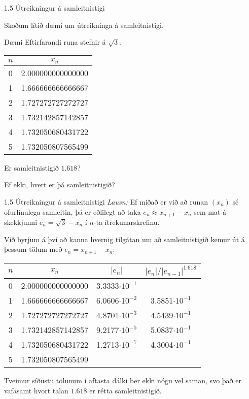 %
\begin{frame}{1.5 Útreikningur á samleitnistigi} 

Skoðum lítið dæmi um útreikninga á samleitnistigi. 

\begin{block}{Dæmi}
Eftirfarandi runa stefnir á  $\sqrt 3$. 
\begin{center}
	\begin{tabular}{c|c|}
		$n$ & $x_n$ \\ \hline
		0&  2.000000000000000 \\
		1&  1.666666666666667 \\
		2&  1.727272727272727 \\
		3&  1.732142857142857 \\
		4&  1.732050680431722 \\
		5&  1.732050807565499 \\
	\end{tabular}
\end{center}
\pause

Er samleitnistigið $1.618$?

Ef ekki, hvert er þá samleitnistigið?
\end{block}
\end{frame}
%

%
\begin{frame}{1.5 Útreikningur á samleitnistigi} 
{\it Lausn:} Ef miðað er við að  runan $(x_n)$ sé  ofurlínulega
samleitin, þá er eðlilegt að taka $e_n\approx x_{n+1}-x_n$ sem mat á
skekkjunni $e_n=\sqrt 3-x_n$ í $n$-ta  
ítrekunarskrefinu. 

\pause

\smallskip
Við byrjum á því að kanna hvernig tilgátan
um að samleitnistigið kemur út á þessum tölum með $e_n=x_{n+1}-x_n$:
\begin{center}
\begin{tabular}{c|c|c|c|}
$n$ & $x_n$ & $|e_n|$ & $|e_n|/|e_{n-1}|^{1.618}$  \\ \hline
0&  2.000000000000000 & 3.3333$\cdot 10^{-1}$ & \\
1&  1.666666666666667 & 6.0606$\cdot 10^{-2}$ & 3.5851$\cdot 10^{-1}$\\
2&  1.727272727272727 & 4.8701$\cdot 10^{-3}$ & 4.5439$\cdot 10^{-1}$\\
3&  1.732142857142857 & 9.2177$\cdot 10^{-5}$ & 5.0837$\cdot 10^{-1}$\\
4&  1.732050680431722 & 1.2713$\cdot 10^{-7}$ & 4.3004$\cdot 10^{-1}$\\
5&  1.732050807565499 & & \\
\end{tabular}
\end{center}\pause
Tveimur síðustu tölunum í aftasta dálki ber ekki nógu vel saman, svo
það er vafasamt hvort talan $1.618$ er rétta
samleitnistigið. 
\end{frame}
%


